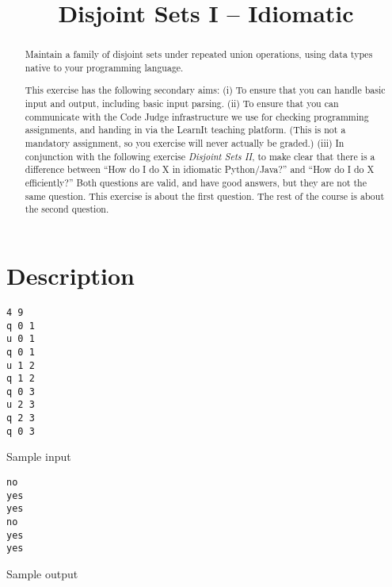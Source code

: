 \documentclass{tufte-handout}
\title{Disjoint Sets I -- Idiomatic}
\author{}
\begin{document}
\maketitle

\begin{abstract}
  Maintain a family of disjoint sets under repeated union operations, using data types native to your programming language.

  This exercise has the following secondary aims:
  (i) To ensure that you can handle basic input and output, including basic input parsing.
  (ii) To ensure that you can communicate with the Code Judge infrastructure we use for checking programming assignments, and handing in via the LearnIt teaching platform.
  (This is not a mandatory assignment, so you exercise will never actually be graded.)
  (iii) In conjunction with the following exercise \emph{Disjoint Sets II}, to make clear that there is a difference between ``How do I do X in idiomatic Python/Java?'' and ``How do I do X efficiently?''
  Both questions are valid, and have good answers, but they are not the same question.
  This exercise is about the first question.
  The rest of the course is about the second question.
\end{abstract}

\section{Description}

\begin{marginfigure}
\begin{verbatim} 
4 9
q 0 1
u 0 1
q 0 1
u 1 2
q 1 2
q 0 3
u 2 3
q 2 3
q 0 3
\end{verbatim} 
  \caption{Sample input}
\end{marginfigure}

\begin{marginfigure}
  \begin{verbatim}
no
yes
yes
no
yes
yes
  \end{verbatim}
  \caption{Sample output}
\end{marginfigure}
\end{document}
